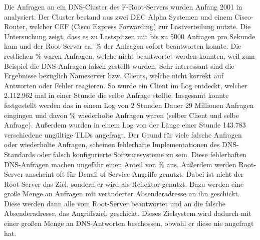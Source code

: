\documentclass[a4paper, 12pt, BCOR10mm, DIV12, toc=bibliography, toc=listof, german]{scrbook}
\begin{document}
	Die Anfragen an ein DNS-Cluster des F-Root-Servers wurden Anfang 2001 in \cite{brclne2001}
	analysiert. Der Cluster bestand aus zwei DEC Alpha Systemen und einem Cisco-Router, welcher CEF
	(Cisco Express Forwarding) zur Lastverteilung nutzte. Die Untersuchung zeigt, dass es zu
	Lastspitzen mit bis zu 5000 Anfragen pro Sekunde kam und der Root-Server ca. \unit[93]{\%} der
	Anfragen sofort beantworten konnte. Die restlichen \unit[7]{\%} waren Anfragen, welche nicht
	beantwortet werden konnten, weil zum Beispiel die DNS-Anfragen falsch gestellt wurden. Sehr
	interessant sind die Ergebnisse bezüglich Nameserver bzw. Clients, welche nicht korrekt auf
	Antworten oder Fehler reagieren. So wurde ein Client im Log entdeckt, welcher 2.112.962 mal in
	einer Stunde die selbe Anfrage stellte.  Insgesamt konnte festgestellt werden das in einem Log
	von 2 Stunden Dauer 29 Millionen Anfragen eingingen und davon \unit[85]{\%} wiederholte
	Anfragen waren (selber Client und selbe Anfrage). Außerdem wurden in einem Log von der Länge
	einer Stunde 143.783 verschiedene ungültige TLDs angefragt. Der Grund für viele falsche Anfragen oder
	wiederholte Anfragen, scheinen fehlerhafte Implementationen des DNS-Standards \cite{rfc1034,
	rfc1035} oder falsch konfigurierte Softwaresysteme zu sein. Diese fehlerhaften DNS-Anfragen
	machen ungefähr einen Anteil von \unit[14]{\%} aus. Außerdem werden Root-Server
	anscheint oft für Denail of Service Angriffe genutzt. Dabei ist nicht der Root-Server das
	Ziel, sondern er wird als Reflektor genutzt. Dazu werden eine große Menge an Anfragen mit
	veränderter Absenderadresse an ihn geschickt. Diese werden dann alle vom Root-Server beantwortet
	und an die falsche Absenderadresse, das Angriffsziel, geschickt. Dieses Zielsystem wird dadurch
	mit einer	großen Menge an DNS-Antworten beschossen, obwohl er diese nie angefragt hat.
\end{document}
